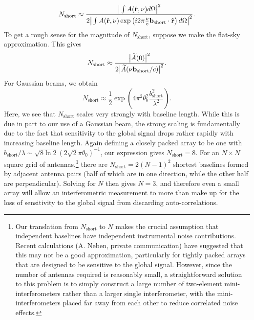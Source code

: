 \documentclass[twocolumn,apj,numberedappendix]{emulateapj}
\newcommand{\rhat}{\hat{\mathbf{r}}}
\newcommand{\acl}[1]{}
\begin{document}
\begin{equation}
\label{eq:Nshort_curved}
N_\textrm{short} \approx  \frac{\big{|} \int  A(\rhat, \nu) d\Omega \big{|}^2}{  2\big{|} \int  A(\rhat, \nu) \exp\left(i 2\pi \frac{\nu }{c}\mathbf{b}_\textrm{short} \cdot \rhat \right)d\Omega \big{|}^2}.
\end{equation}
To get a rough sense for the magnitude of $N_\textrm{short}$, suppose we make the flat-sky approximation. This gives
\begin{equation}
N_\textrm{short} \approx \frac{\big{|} \widetilde{A}(0)\big{|}^2}{2 \big{|} \widetilde{A}(\nu \mathbf{b}_\textrm{short} / c)\big{|}^2}.
\end{equation}
For Gaussian beams, we obtain
\begin{equation}
N_\textrm{short} \approx \frac{1}{2} \exp \left( 4 \pi^2 \theta_b^2 \frac{b_\textrm{short}^2}{\lambda^2} \right).
\end{equation}
\acl{Edited here for factor of 2. We might also want to talk about how sensitive this is to antenna design.} Here, we see that $N_\textrm{short}$ scales very strongly with baseline length. While this is due
in part to our use of a Gaussian beam, the strong scaling is fundamentally due to the fact that
sensitivity to the global signal drops rather rapidly with increasing baseline length. Again defining a closely packed array to be one with $b_\textrm{short}/ \lambda \sim \sqrt{8 \ln 2} (2 \sqrt{2} \pi \theta_0)^{-1}$, our expression gives $N_\textrm{short} = 8$. For an $N \times N$ square grid of antennas,\footnote{Our translation from $N_\textrm{short}$ to $N$ makes the crucial assumption that independent baselines have independent instrumental noise contributions. Recent calculations (A. Neben, private communication) have suggested that this may not be a good approximation, particularly for tightly packed arrays that are designed to be sensitive to the global signal. However, since the number of antennas required is reasonably small, a straightforward solution to this problem is to simply construct a large number of two-element mini-interferometers rather than a larger single interferometer, with the mini-interferometers placed far away from each other to reduce correlated noise effects.} there are $N_\textrm{short} = 2(N-1)^2$ shortest baselines formed by adjacent antenna pairs (half of which are in one direction, while the other half are perpendicular). Solving for $N$ then gives $N=3$, and therefore even a small array will allow an interferometric measurement to more than make up for the loss of sensitivity to the global signal from discarding auto-correlations.
\end{document}
